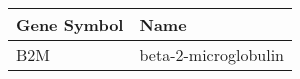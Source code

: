 \begin{tabular}{ll}
\toprule
Gene Symbol &                 Name \\
\midrule
        B2M & beta-2-microglobulin \\
\bottomrule
\end{tabular}
